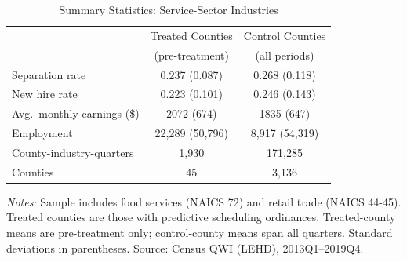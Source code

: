 \begin{table}[htbp]
\centering
\caption{Summary Statistics: Service-Sector Industries}
\label{tab:summary}
\begin{threeparttable}
\begin{tabular}{lcc}
\toprule
 & Treated Counties & Control Counties \\
 & (pre-treatment) & (all periods) \\
\midrule
Separation rate & 0.237 (0.087) & 0.268 (0.118) \\
New hire rate & 0.223 (0.101) & 0.246 (0.143) \\
Avg.\ monthly earnings (\$) & 2072 (674) & 1835 (647) \\
Employment & 22,289 (50,796) & 8,917 (54,319) \\
County-industry-quarters & 1,930 & 171,285 \\
Counties & 45 & 3,136 \\
\bottomrule
\end{tabular}
\begin{tablenotes}[flushleft]\small
\item \textit{Notes:} Sample includes food services (NAICS 72) and retail trade (NAICS 44-45). Treated counties are those with predictive scheduling ordinances. Treated-county means are pre-treatment only; control-county means span all quarters. Standard deviations in parentheses. Source: Census QWI (LEHD), 2013Q1--2019Q4.
\end{tablenotes}
\end{threeparttable}
\end{table}
